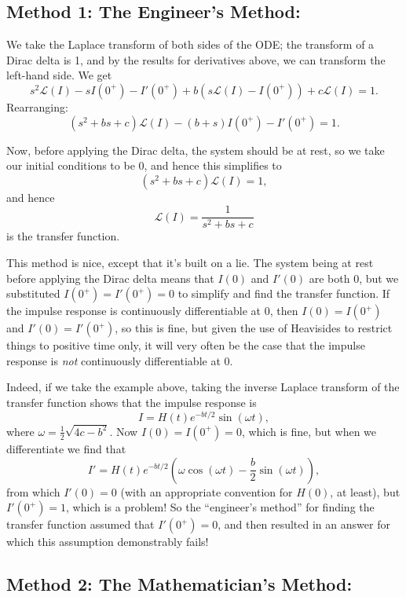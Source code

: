 \documentclass{article}
\begin{document}
\subsection{Method 1: The Engineer's Method:}

We take the Laplace transform of both sides of the ODE; the transform of a Dirac delta is 1, and by the results for derivatives above, we can transform the left-hand side. We get
\[s^2\mathcal{L}(I)-sI(0^+)-I'(0^+)+b\left(s\mathcal{L}(I)-I(0^+)\right) + c\mathcal{L}(I)=1.\]
Rearranging:
\[(s^2+bs+c)\mathcal{L}(I)-(b+s)I(0^+) - I'(0^+)=1.\]

Now, before applying the Dirac delta, the system should be at rest, so we take our initial conditions to be 0, and hence this simplifies to
\[(s^2+bs+c)\mathcal{L}(I)=1,\]
and hence
\[\mathcal{L}(I)=\frac{1}{s^2+bs+c}\]
is the transfer function.\bigskip




This method is nice, except that it's built on a lie. The system being at rest before applying the Dirac delta means that $I(0)$ and $I'(0)$ are both 0, but we substituted $I(0^+)=I'(0^+)=0$ to simplify and find the transfer function. If the impulse response is continuously differentiable at 0, then $I(0)=I(0^+)$ and $I'(0)=I'(0^+)$, so this is fine, but given the use of Heavisides to restrict things to positive time only, it will very often be the case that the impulse response is \textit{not} continuously differentiable at 0.

Indeed, if we take the example above, taking the inverse Laplace transform of the transfer function shows that the impulse response is
\[I=H(t)e^{-bt/2}\sin(\omega t),\]
where $\omega=\frac{1}{2}\sqrt{4c-b^2}$. Now $I(0)=I(0^+)=0$, which is fine, but when we differentiate we find that
\[I'=H(t)e^{-bt/2}\left(\omega\cos(\omega t) - \frac{b}{2}\sin(\omega t)\right),\]
from which $I'(0)=0$ (with an appropriate convention for $H(0)$, at least), but $I'(0^+)=1$, which is a problem! So the ``engineer's method'' for finding the transfer function assumed that $I'(0^+)=0$, and then resulted in an answer for which this assumption demonstrably fails!\bigskip




\subsection{Method 2: The Mathematician's Method:}
\end{document}
